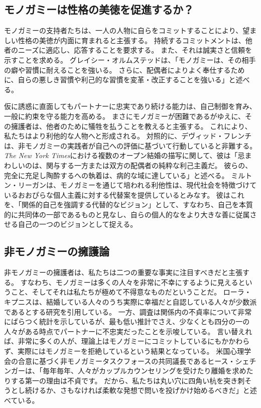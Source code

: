 \documentclass[paper=a4,book,openany]{jlreq} \usepackage{mystyle}
\begin{document}
\subsection{モノガミーは性格の美徳を促進するか？}

モノガミーの支持者たちは、一人の人物に自らをコミットすることにより、望ましい性格の美徳が内面に育まれると主張する。
持続するコミットメントは、他者のニーズに適応し、応答することを要求する。
また、それは誠実さと信頼を示すことを求める。
グレイシー・オルムステッドは、「モノガミーは、その相手の癖や習慣に耐えることを強いる。
さらに、配偶者によりよく奉仕するために、自らの悪しき習慣や利己的な習慣を変革・改正することを強いる」と述べる\citep{olmstead14:_in_defen_monog_marriag}。

仮に誘惑に直面してもパートナーに忠実であり続ける能力は、自己制御を育み、一般に約束を守る能力を高める。
まさにモノガミーが困難であるがゆえに、その擁護者は、他者のために犠牲を払うことを教えると主張する。
これにより、私たちはより利他的な人物へと形成される。
対照的に、デヴィッド・フレンチは、非モノガミーの実践者が自己への評価に基づいて行動していると非難する。
\emph{The New York Times}における複数のオープン結婚の描写に関して、彼は「忌まわしいのは、関与する一方または双方の配偶者の純粋な利己主義だ。
彼らの、完全に充足し陶酔するへの執着は、病的な域に達している」と述べる\citep{french17:_this_is_how_elite_poison_our_cultur}。
ミルトン・リーガンは、モノガミーを通じて培われる利他性は、現代社会を特徴づけているおおぴらな個人主義に対する代替案を提供しているとみなす。
彼はこれを、「関係的自己を強調する代替的なビジョン」として、すなわち、自己を本質的に共同体の一部であるものと見なし、自らの個人的なをより大きな善に従属させる自己の一つのビジョンとして捉える\citep[p.159]{regan96:_postm_famil_law}。

\subsection{非モノガミーの擁護論}

非モノガミーの擁護者は、私たちは二つの重要な事実に注目すべきだと主張する。
すなわち、モノガミーは多くの人々を非常に不幸にするように見えるということ、そしてそれは私たちが極めて不得意なものだということだ。
ローラ・キプニスは、結婚している人々のうち実際に幸福だと自認している人々が少数派であるとする研究を引用している\citep{kipnis03:_again_love}。
一方、調査は関係内の不貞率について非常にばらつく統計を示しているが、最も低い推計でさえ、少なくとも四分の一の人々がある時点でパートナーに不忠実だったことを示唆している\citep{blow05:_infid_commit_relat_ii,whisman07:_sexual_infid_nation_survey_americ_women}。
言い替えれば、非常に多くの人が、理論上はモノガミーにコミットしているにもかかわらず、実際にはモノガミーを拒絶しているという結果となっている。
米国心理学会の合意に基づく非モノガミータスクフォースの共同議長であるヒース・シェチンガーは、「毎年毎年、人々がカップルカウンセリングを受けたり離婚を求めたりする第一の理由は不貞です。
だから、私たちは丸い穴に四角い杭を突き刺そうとし続けるか、さもなければ柔軟な発想で問いを投げかけ始めるべきだ」と述べている\citep{hunt20:_psych_threes}。
\end{document}
